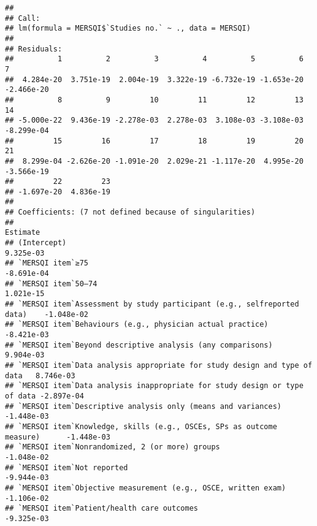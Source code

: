 \documentclass[]{article}
\newenvironment{Shaded}{\begin{snugshade}}{\end{snugshade}}
\newcommand{\CommentTok}[1]{\textcolor[rgb]{0.56,0.35,0.01}{\textit{#1}}}
\newcommand{\DataTypeTok}[1]{\textcolor[rgb]{0.13,0.29,0.53}{#1}}
\newcommand{\KeywordTok}[1]{\textcolor[rgb]{0.13,0.29,0.53}{\textbf{#1}}}
\newcommand{\NormalTok}[1]{#1}
\newcommand{\OperatorTok}[1]{\textcolor[rgb]{0.81,0.36,0.00}{\textbf{#1}}}
\newcommand{\StringTok}[1]{\textcolor[rgb]{0.31,0.60,0.02}{#1}}
\begin{document}
\begin{Shaded}
\end{Shaded}

\begin{verbatim}
## 
## Call:
## lm(formula = MERSQI$`Studies no.` ~ ., data = MERSQI)
## 
## Residuals:
##          1          2          3          4          5          6          7 
##  4.284e-20  3.751e-19  2.004e-19  3.322e-19 -6.732e-19 -1.653e-20 -2.466e-20 
##          8          9         10         11         12         13         14 
## -5.000e-22  9.436e-19 -2.278e-03  2.278e-03  3.108e-03 -3.108e-03 -8.299e-04 
##         15         16         17         18         19         20         21 
##  8.299e-04 -2.626e-20 -1.091e-20  2.029e-21 -1.117e-20  4.995e-20 -3.566e-19 
##         22         23 
## -1.697e-20  4.836e-19 
## 
## Coefficients: (7 not defined because of singularities)
##                                                                             Estimate
## (Intercept)                                                                9.325e-03
## `MERSQI item`≥75                                                          -8.691e-04
## `MERSQI item`50–74                                                         1.021e-15
## `MERSQI item`Assessment by study participant (e.g., selfreported data)    -1.048e-02
## `MERSQI item`Behaviours (e.g., physician actual practice)                 -8.421e-03
## `MERSQI item`Beyond descriptive analysis (any comparisons)                 9.904e-03
## `MERSQI item`Data analysis appropriate for study design and type of data   8.746e-03
## `MERSQI item`Data analysis inappropriate for study design or type of data -2.897e-04
## `MERSQI item`Descriptive analysis only (means and variances)              -1.448e-03
## `MERSQI item`Knowledge, skills (e.g., OSCEs, SPs as outcome measure)      -1.448e-03
## `MERSQI item`Nonrandomized, 2 (or more) groups                            -1.048e-02
## `MERSQI item`Not reported                                                 -9.944e-03
## `MERSQI item`Objective measurement (e.g., OSCE, written exam)             -1.106e-02
## `MERSQI item`Patient/health care outcomes                                 -9.325e-03

\end{verbatim}
\end{document}
